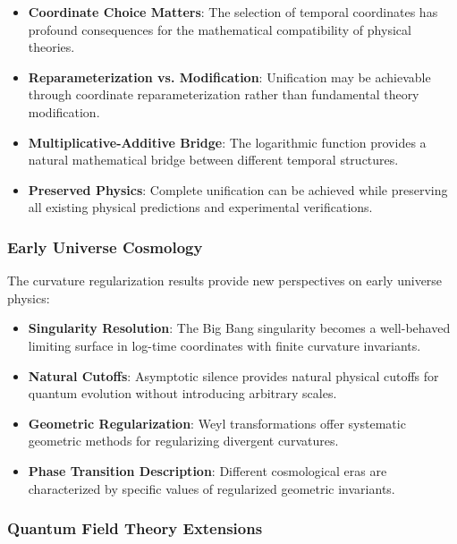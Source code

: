 \begin{itemize}
\item \textbf{Coordinate Choice Matters}: The selection of temporal coordinates has profound consequences for the mathematical compatibility of physical theories.

\item \textbf{Reparameterization vs. Modification}: Unification may be achievable through coordinate reparameterization rather than fundamental theory modification.

\item \textbf{Multiplicative-Additive Bridge}: The logarithmic function provides a natural mathematical bridge between different temporal structures.

\item \textbf{Preserved Physics}: Complete unification can be achieved while preserving all existing physical predictions and experimental verifications.
\end{itemize}

\subsubsection{Early Universe Cosmology}

The curvature regularization results provide new perspectives on early universe physics:

\begin{itemize}
\item \textbf{Singularity Resolution}: The Big Bang singularity becomes a well-behaved limiting surface in log-time coordinates with finite curvature invariants.

\item \textbf{Natural Cutoffs}: Asymptotic silence provides natural physical cutoffs for quantum evolution without introducing arbitrary scales.

\item \textbf{Geometric Regularization}: Weyl transformations offer systematic geometric methods for regularizing divergent curvatures.

\item \textbf{Phase Transition Description}: Different cosmological eras are characterized by specific values of regularized geometric invariants.
\end{itemize}

\subsubsection{Quantum Field Theory Extensions}

